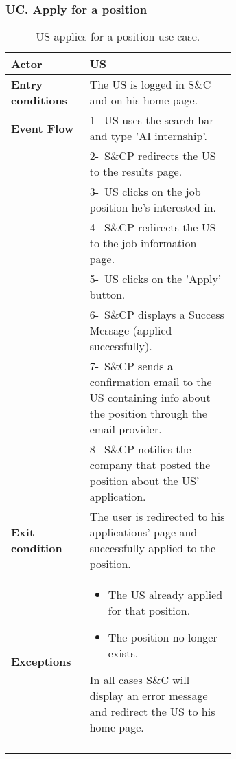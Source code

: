 \subsubsection*{UC\cuc . Apply for a position}
\begin{center}
    \begin{longtable}{|l|p{0.65\linewidth}|}
        \hline
        \textbf{Actor}            & US \\
        \hline
        \textbf{Entry conditions} & The US is logged in S\&C and on his home page.  \\
        \hline
        \textbf{Event Flow}       & 1-\ US uses the search bar and type 'AI internship'.  \\
        & 2-\ S\&CP redirects the US to the results page. \\
        & 3-\ US clicks on the job position he's interested in. \\
        & 4-\ S\&CP redirects the US to the job information page. \\
        & 5-\ US clicks on the 'Apply' button. \\
        & 6-\ S\&CP displays a Success Message (applied successfully).\\
        & 7-\ S\&CP sends a confirmation email to the US containing info about the position through the email provider. \\
        & 8-\ S\&CP notifies the company that posted the position about the US' application. \\
        \hline
        \textbf{Exit condition}   &  The user is redirected to his applications' page and successfully applied to the position. \\
        \hline
        \textbf{Exceptions}       & \begin{itemize}
            \item The US already applied for that position. 
            \item The position no longer exists.
        \end{itemize} In all cases S\&C will display an error message and redirect the US to his home page.
        \\
        \hline
        \caption{US applies for a position use case.}
        \label{tab: cp_use_case}
    \end{longtable}
\end{center}


